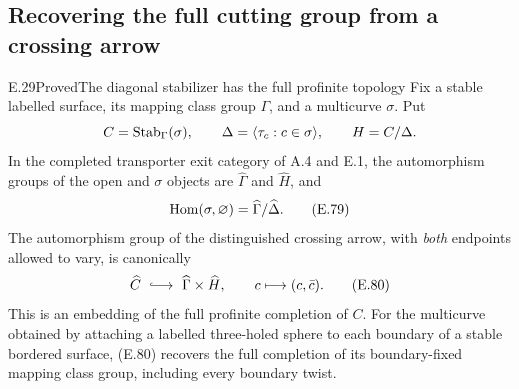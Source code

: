 \subsection{Recovering the full cutting group from a crossing arrow}

\begin{result}{E.29}{Proved}{The diagonal stabilizer has the full profinite topology}
Fix a stable labelled surface, its mapping class group $\Gamma$, and a
multicurve $\sigma$.  Put
\[
 C=\operatorname{Stab}_\Gamma(\sigma),\qquad
 \Delta=\langle\tau_c:c\in\sigma\rangle,\qquad H=C/\Delta.
\]
In the completed transporter exit category of A.4 and E.1, the
automorphism groups of the open and $\sigma$ objects are
$\widehat\Gamma$ and $\widehat H$, and
\[
 \operatorname{Hom}(\sigma,\varnothing)=\widehat\Gamma/\widehat\Delta.
                                                               \tag{E.79}
\]
The automorphism group of the distinguished crossing arrow, with
\emph{both} endpoints allowed to vary, is canonically
\[
 \widehat C\ \lhook\joinrel\longrightarrow\
       \widehat\Gamma\times\widehat H,
 \qquad c\longmapsto(c,\bar c).                                \tag{E.80}
\]
This is an embedding of the full profinite completion of $C$.
For the multicurve obtained by attaching a labelled three-holed
sphere to each boundary of a stable bordered surface, (E.80)
recovers the full completion of its boundary-fixed mapping class
group, including every boundary twist.
\end{result}
